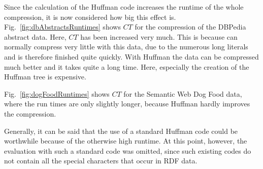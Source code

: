 Since the calculation of the Huffman code increases the runtime of the whole compression, it is now considered how big this effect is. Fig.~\ref{fig:dbAbstractsRuntimes} shows $CT$ for the compression of the DBPedia abstract data. Here, $CT$ has been increased very much. This is because \DHDT{} can normally compress very little with this data, due to the numerous long literals and is therefore finished quite quickly. With Huffman the data can be compressed much better and it takes quite a long time. Here, especially the creation of the Huffman tree is expensive.

Fig.~\ref{fig:dogFoodRuntimes} shows $CT$ for the Semantic Web Dog Food data, where the run times are only slightly longer, because Huffman hardly improves the compression.

Generally, it can be said that the use of a standard Huffman code could be worthwhile because of the otherwise high runtime. At this point, however, the evaluation with such a standard code was omitted, since such existing codes do not contain all the special characters that occur in RDF data.


